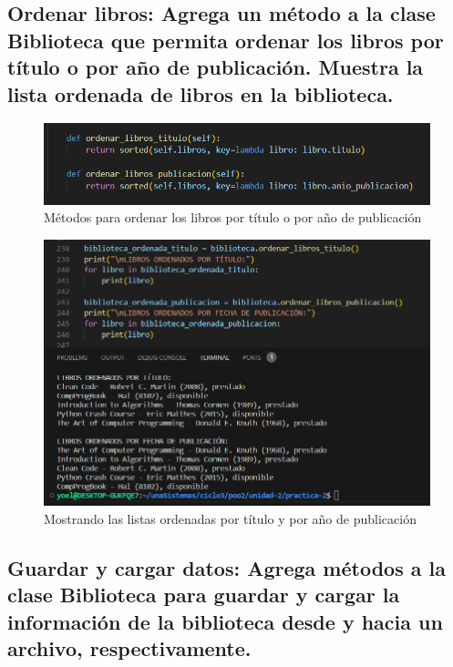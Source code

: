 \documentclass[11pt,a4paper]{article}
\begin{document}
\subsection{Ordenar libros:
Agrega un método a la clase Biblioteca que permita ordenar los libros por título o por año de publicación.
Muestra la lista ordenada de libros en la biblioteca.}


\begin{figure}[H]
    \centering
    \includegraphics[width=1\linewidth]{images/9-1.png}
    \caption{Métodos para ordenar los libros por título o por año de publicación}
    \label{fig:enter-label}
\end{figure}


\begin{figure}[H]
    \centering
    \includegraphics[width=1\linewidth]{images/9-2.png}
    \caption{Mostrando las listas ordenadas por título y por año de publicación}
    \label{fig:enter-label}
\end{figure}

\subsection{Guardar y cargar datos:
Agrega métodos a la clase Biblioteca para guardar y cargar la información de la biblioteca desde y hacia un archivo, respectivamente.}
\end{document}
